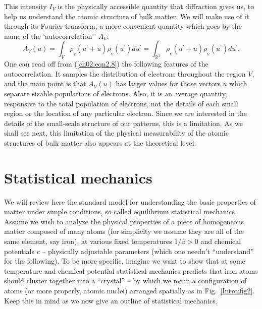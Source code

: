 \documentclass[reqno]{stml-l}
\theoremstyle{plain}
\theoremstyle{definition}
\numberwithin{equation}{chapter}
\begin{document}
This intensity $I_{V}$ is the physically accessible quantity that diffraction gives us, to help us understand the atomic structure of bulk matter. We will make use of it through its Fourier transform, a more convenient quantity which goes by the name of the `autocorrelation'' $A_{V}$:
\begin{equation}
A_{V}(u)= \int_{V}\rho_{_{V}}(u^{\prime}+u)\rho_{_{V}}(u^{\prime})du^{\prime}=\int_{\mathbb{R}^{3}}\rho_{_{V}}(u^{\prime}+u)\rho_{_{V}}(u^{\prime})du^{\prime}.\label{ch02:eqn2.8} \end{equation}
One can read off from (\ref{ch02:eqn2.8}) the following features of the autocorrelation. It samples the distribution of electrons throughout the region $V$, and the main point is that $A_{V}(u)$ has larger values for those vectors $u$ which separate sizable populations of electrons. Also, it is an average quantity, responsive to the total population of electrons, not the details of each small region or the location of any particular electron. Since we are interested in the details of the small-scale structure of our patterns, this is a limitation. As we shall see next, this limitation of the physical measurability of the atomic structures of bulk matter also appears at the theoretical level.

\section{Statistical mechanics}\label{ch02:sec2}

We will review here the standard model for understanding
the basic properties of matter under simple conditions, so
called equilibrium statistical mechanics. Assume we wish to
analyze the physical properties of a piece of homogeneous
matter composed of many atoms (for simplicity we assume
they are all of the same element, say iron), at various
fixed temperatures $1/\beta>0$ and chemical potentials $c$
-- physically adjustable parameters (which one needn't
``understand'' for the following). To be more specific,
imagine we want to show that at some temperature and
chemical potential statistical mechanics predicts that iron
atoms should cluster together into a ``crystal'' -- by
which we mean a configuration of atoms (or more properly,
atomic nuclei) arranged spatially as in
Fig.~\ref{Intro:fig2}. Keep this in mind as we now give an
outline of statistical mechanics.
\end{document}
